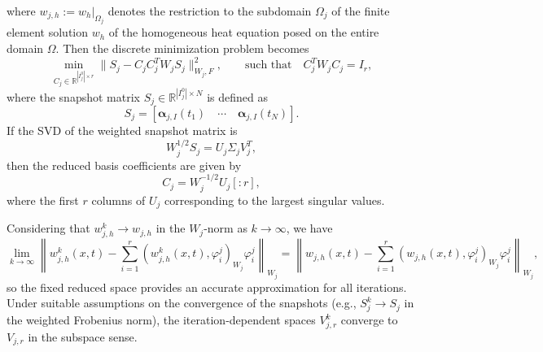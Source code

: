 \documentclass[a4paper, 11pt]{article}
\theoremstyle{remark}
\begin{document}
where $w_{j,h} := w_h|_{\Omega_j}$ denotes the restriction to the subdomain $\Omega_j$ of the finite element solution $w_h$ of the homogeneous heat equation posed on the entire domain $\Omega$. Then the discrete minimization problem becomes
\begin{equation*}
    \min_{C_{j}\in \mathbb{R}^{|I_{j}^{0}|\times r}}\lVert S_{j} - C_{j}C^{T}_{j}W_{j}S_{j}\rVert_{W_{j}, F}^{2}, \qquad \text{such that} \quad C^{T}_{j}W_{j}C_{j} = I_{r},
\end{equation*}
where the snapshot matrix $S_{j}\in\mathbb{R}^{|I_{j}^{0}|\times N}$ is defined as
\begin{equation*}
    S_{j} = \left[\boldsymbol{\alpha}_{j, I}(t_{1}) \quad \cdots \quad \boldsymbol{\alpha}_{j, I}(t_{N})\right].
\end{equation*}
If the SVD of the weighted snapshot matrix is
\begin{equation*}
    W_{j}^{1/2} S_j = U_{j} \Sigma_{j} V^{T}_{j},
\end{equation*}
then the reduced basis coefficients are given by
\begin{equation*}
    C_j = W_{j}^{-1/2} U_{j}[:r],
\end{equation*}
where the first $r$ columns of $U_{j}$ corresponding to the largest singular values. 

\vspace{10pt}
\noindent Considering that $w^{k}_{j, h} \to w_{j, h}$ in the $W_{j}$-norm as $k\to\infty$, we have
\begin{equation*}
    \lim_{k\to \infty}\left\lVert w^{k}_{j, h}(x, t) - \sum_{i=1}^{r}(w^{k}_{j, h}(x, t), \varphi^{j}_{i})_{W_{j}}\varphi^{j}_{i}\right\rVert_{W_{j}} = \left\lVert w_{j, h}(x, t) - \sum_{i=1}^{r}(w_{j, h}(x, t), \varphi^{j}_{i})_{W_{j}}\varphi^{j}_{i}\right\rVert_{W_{j}},
\end{equation*}
so the fixed reduced space provides an accurate approximation for all iterations. Under suitable assumptions on the convergence of the snapshots (e.g., $S_j^k \to S_j$ in the weighted Frobenius norm), the iteration-dependent spaces $V_{j,r}^{k}$ converge to $V_{j,r}$ in the subspace sense.
\end{document}
